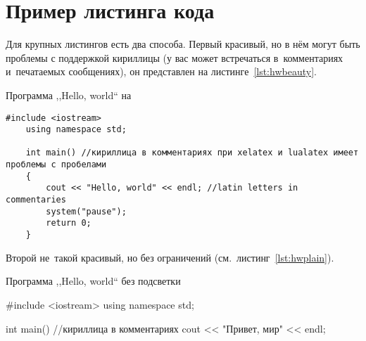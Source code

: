 \chapter{Пример листинга кода}\label{app:B}
Для крупных листингов есть два способа. Первый красивый, но в нём могут быть
проблемы с поддержкой кириллицы (у вас может встречаться в~комментариях
и~печатаемых сообщениях), он представлен на листинге~\cref{lst:hwbeauty}.
\begin{ListingEnv}[!h]%
    \captiondelim{ } %
    \caption{Программа ,,Hello, world`` на \protect\cpp}\label{lst:hwbeauty}
    \begin{lstlisting}[language={[ISO]C++}]
	#include <iostream>
	using namespace std;

	int main() //кириллица в комментариях при xelatex и lualatex имеет проблемы с пробелами
	{
		cout << "Hello, world" << endl; //latin letters in commentaries
		system("pause");
		return 0;
	}
    \end{lstlisting}
\end{ListingEnv}%
Второй не~такой красивый, но без ограничений (см.~листинг~\cref{lst:hwplain}).
\begin{ListingEnv}[!h]
    \captiondelim{ } %
    \caption{Программа ,,Hello, world`` без подсветки}\label{lst:hwplain}
    \begin{Verb}

        #include <iostream>
        using namespace std;

        int main() //кириллица в комментариях
        {
            cout << "Привет, мир" << endl;
        }
    \end{Verb}
\end{ListingEnv}



\clearpage
{}